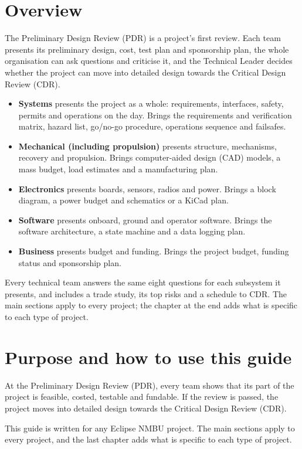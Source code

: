 \documentclass{../../Common/Latex/Templates/rapport}
\date{4 October 2026}
\renewcommand{\vsection}[1]{\section{#1}}
\begin{document}
\makecoverpage
\tableofcontents
\reportmainmatter

\vsection{Overview}
The Preliminary Design Review (PDR) is a project's first review. Each team presents its preliminary design, cost, test plan and sponsorship plan, the whole organisation can ask questions and criticise it, and the Technical Leader decides whether the project can move into detailed design towards the Critical Design Review (CDR).

\begin{itemize}
  \item \textbf{Systems} presents the project as a whole: requirements, interfaces, safety, permits and operations on the day. Brings the requirements and verification matrix, hazard list, go/no-go procedure, operations sequence and failsafes.
  \item \textbf{Mechanical (including propulsion)} presents structure, mechanisms, recovery and propulsion. Brings computer-aided design (CAD) models, a mass budget, load estimates and a manufacturing plan.
  \item \textbf{Electronics} presents boards, sensors, radios and power. Brings a block diagram, a power budget and schematics or a KiCad plan.
  \item \textbf{Software} presents onboard, ground and operator software. Brings the software architecture, a state machine and a data logging plan.
  \item \textbf{Business} presents budget and funding. Brings the project budget, funding status and sponsorship plan.
\end{itemize}

Every technical team answers the same eight questions for each subsystem it presents, and includes a trade study, its top risks and a schedule to CDR. The main sections apply to every project; the chapter at the end adds what is specific to each type of project.

\vsection{Purpose and how to use this guide}
At the Preliminary Design Review (PDR), every team shows that its part of the project is feasible, costed, testable and fundable. If the review is passed, the project moves into detailed design towards the Critical Design Review (CDR).

This guide is written for any Eclipse NMBU project. The main sections apply to every project, and the last chapter adds what is specific to each type of project.
\end{document}
